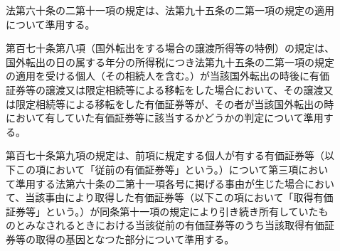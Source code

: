 \documentclass[twocolumn,a4j,10pt]{ltjtarticle}
\begin{document}
\begin{description}
\item[]法第六十条の二第十一項の規定は、法第九十五条の二第一項の規定の適用について準用する。
\item[]第百七十条第八項（国外転出をする場合の譲渡所得等の特例）の規定は、国外転出の日の属する年分の所得税につき法第九十五条の二第一項の規定の適用を受ける個人（その相続人を含む。）が当該国外転出の時後に有価証券等の譲渡又は限定相続等による移転をした場合において、その譲渡又は限定相続等による移転をした有価証券等が、その者が当該国外転出の時において有していた有価証券等に該当するかどうかの判定について準用する。
\item[]第百七十条第九項の規定は、前項に規定する個人が有する有価証券等（以下この項において「従前の有価証券等」という。）について第三項において準用する法第六十条の二第十一項各号に掲げる事由が生じた場合において、当該事由により取得した有価証券等（以下この項において「取得有価証券等」という。）が同条第十一項の規定により引き続き所有していたものとみなされるときにおける当該従前の有価証券等のうち当該取得有価証券等の取得の基因となつた部分について準用する。
\end{description}
\end{document}
